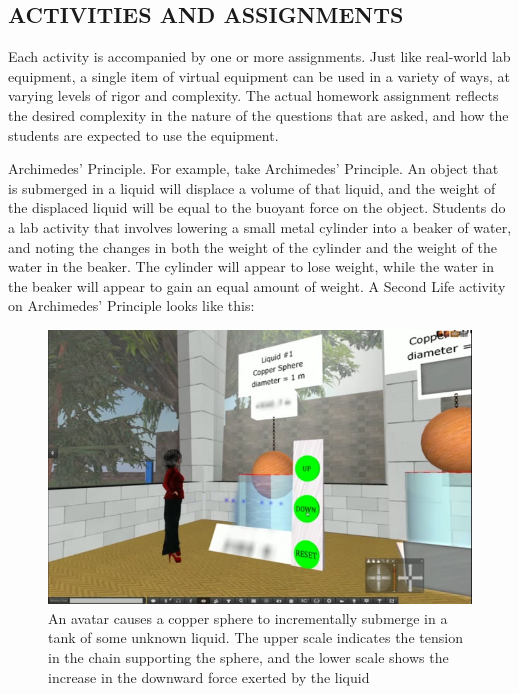 \documentclass[11.5pt]{sig-alternate} %
\begin{document}
\begin{large}
\section*{ACTIVITIES AND ASSIGNMENTS}

Each activity is accompanied by one or more assignments. Just like real-world lab equipment, a single item of virtual equipment can be used in a variety of ways, at varying levels of rigor and complexity. The actual homework assignment reflects the desired complexity in the nature of the questions that are asked, and how the students are expected to use the equipment.

Archimedes’ Principle. For example, take Archi\-medes’ Principle. An object that is submerged in a liquid will displace a volume of that liquid, and the weight of the displaced liquid will be equal to the buoyant force on the object. Students do a lab activity that involves lowering a small metal cylinder into a beaker of water, and noting the changes in both the weight of the cylinder and the weight of the water in the beaker. The cylinder will appear to lose weight, while the water in the beaker will appear to gain an equal amount of weight. A Second Life activity on Archimedes’ Principle looks like this:

\begin{figure}[h]
    \centering
    \includegraphics[width=1\linewidth]{fig 3.jpg}
    \caption{An avatar causes a copper sphere to incrementally submerge in a tank of some unknown liquid. The upper scale indicates the tension in the chain supporting the sphere, and the lower scale shows the increase in the downward force exerted by the liquid}
\end{figure}


\end{large}
\end{document}
